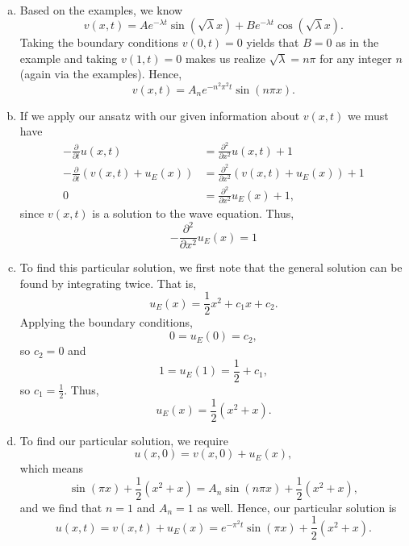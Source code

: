 \documentclass[12pt]{article} %
\begin{document}
\begin{solution}~
    \begin{enumerate}[(a)]
    \item Based on the examples, we know
    \[
    v(x,t) = Ae^{-\lambda t} \sin(\sqrt{\lambda}x)+B e^{-\lambda t} \cos(\sqrt{\lambda}x).
    \]
    Taking the boundary conditions $v(0,t)=0$ yields that $B=0$ as in the example and taking $v(1,t)=0$ makes us realize $\sqrt{\lambda} = n\pi$ for any integer $n$ (again via the examples). Hence, 
    \[
    v(x,t) = A_n e^{-n^2 \pi^2 t} \sin(n\pi x).
    \]

    \item If we apply our ansatz with our given information about $v(x,t)$ we must have
    \begin{align*}
    -\frac{\partial}{\partial t}u(x,t) &= \frac{\partial^2}{\partial x^2}u(x,t)+1\\
     -\frac{\partial}{\partial t}(v(x,t)+u_E(x)) &= \frac{\partial^2}{\partial x^2}(v(x,t)+u_E(x))+1\\
    0 &= \frac{\partial^2}{\partial x^2}u_E(x)+1,
    \end{align*}
    since $v(x,t)$ is a solution to the wave equation. Thus,
    \[
 -\frac{\partial^2}{\partial x^2}u_E(x)=1
    \]

    \item To find this particular solution, we first note that the general solution can be found by integrating twice. That is,
    \[
    u_E(x) = \frac{1}{2}x^2+c_1x+c_2.
    \]
    Applying the boundary conditions,
    \[
    0=u_E(0)=c_2,
    \]
    so $c_2=0$ and
    \[
    1=u_E(1)=\frac{1}{2}+c_1,
    \]
    so $c_1=\frac{1}{2}$. Thus,
    \[
    u_E(x)=\frac{1}{2}(x^2+x).
    \]

    \item To find our particular solution, we require
    \[
    u(x,0) = v(x,0)+u_E(x),
    \]
    which means
    \[
    \sin\left(\pi x\right) + \frac{1}{2}(x^2+x)= A_n \sin(n\pi x) + \frac{1}{2}(x^2+x),
    \]
    and we find that $n=1$ and $A_n=1$ as well. Hence, our particular solution is
    \[
    u(x,t) = v(x,t)+u_E(x) = e^{-\pi^2 t}\sin\left(\pi x\right) + \frac{1}{2}(x^2+x).
    \]
\end{enumerate}
\end{solution}
\end{document}
